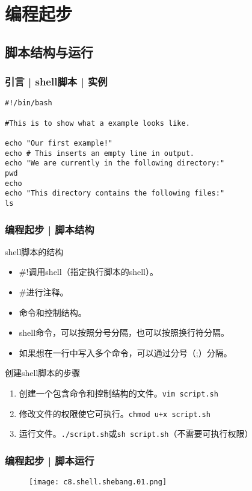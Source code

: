 \section{编程起步}
\subsection{脚本结构与运行}
\begin{frame}[fragile]
  \frametitle{引言 | shell脚本 | 实例}
\begin{lstlisting}
#!/bin/bash

#This is to show what a example looks like.

echo "Our first example!"
echo # This inserts an empty line in output.
echo "We are currently in the following directory:"
pwd
echo
echo "This directory contains the following files:"
ls
\end{lstlisting}
\end{frame}

\begin{frame}[fragile]
  \frametitle{编程起步 | \alert{脚本结构}}
  \begin{block}{shell脚本的结构}
    \begin{itemize}
      \item \#!调用shell（指定执行脚本的shell）。
      \item \#进行注释。
      \item 命令和控制结构。
      \item shell命令，可以按照分号分隔，也可以按照换行符分隔。
      \item 如果想在一行中写入多个命令，可以通过分号（;）分隔。
    \end{itemize}
  \end{block}
  \pause
  \begin{block}{创建shell脚本的步骤}
    \begin{enumerate}
      \item 创建一个包含命令和控制结构的文件。\verb|vim script.sh|
      \item 修改文件的权限使它可执行。\verb|chmod u+x script.sh|
      \item 运行文件。\verb|./script.sh|或\verb|sh script.sh|（不需要可执行权限）
    \end{enumerate}
  \end{block}
\end{frame}

\begin{frame}
  \frametitle{编程起步 | 脚本运行}
  \begin{figure}
    \centering
    \texttt{[image: c8.shell.shebang.01.png]}
  \end{figure}
\end{frame}

